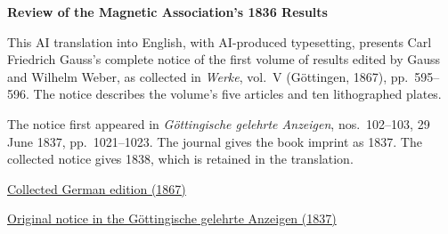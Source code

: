 \clearpage
\thispagestyle{empty}
\begin{center}\Large\textbf{Review of the Magnetic Association’s 1836 Results}\end{center}

This AI translation into English, with AI-produced typesetting, presents Carl Friedrich Gauss’s complete notice of the first volume of results edited by Gauss and Wilhelm Weber, as collected in \textit{Werke}, vol.~V (Göttingen, 1867), pp.~595--596. The notice describes the volume’s five articles and ten lithographed plates.

The notice first appeared in \textit{Göttingische gelehrte Anzeigen}, nos.~102--103, 29 June 1837, pp.~1021--1023. The journal gives the book imprint as 1837. The collected notice gives 1838, which is retained in the translation.

\medskip\noindent
\href{https://gdz.sub.uni-goettingen.de/id/PPN236006339}{Collected German edition (1867)}\par
\noindent\href{https://gdz.sub.uni-goettingen.de/id/PPN385030444_1837_1}{Original notice in the Göttingische gelehrte Anzeigen (1837)}
\clearpage
